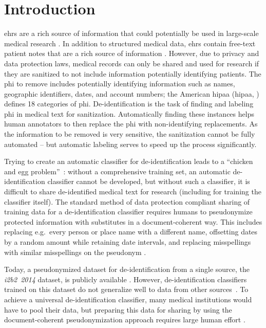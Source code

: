 

\section{Introduction}\label{sec:introduction}
%
\Acp{ehr} are a rich source of information that could potentially be used in large-scale medical research \citep{botsis2010secondary, birkhead2015uses, cowie2017electronic}.
%
In addition to structured medical data, \acp{ehr} contain free-text patient notes that are a rich source of information \citep{jensen2012mining}.
%
However, due to privacy and data protection laws, medical records can only be shared and used for research if they are sanitized to not include information potentially identifying patients.
%
The \ac{phi} to remove includes potentially identifying information such as names, geographic identifiers, dates, and account numbers; the American \acl{hipaa} (\acs{hipaa}, \citeyear{usa1996hipaa}) defines 18 categories of \ac{phi}.
%
De-identification is the task of finding and labeling \ac{phi} in medical text for sanitization.
Automatically finding these instances helps human annotators to then replace the \ac{phi} with
non-identifying replacements.  As the information to be removed is very sensitive, the sanitization
cannot be fully automated -- but automatic labeling serves to speed up the process significantly.

%
Trying to create an automatic classifier for de-identification leads to a ``chicken and egg problem''~\citep{uzuner2007evaluating}: without a comprehensive training set, an automatic de-identification classifier cannot be developed, but without such a classifier, it is difficult to share de-identified medical text for research (including for training the classifier itself).
%
The standard method of data protection compliant sharing of training data for a de-identification classifier requires humans to pseudonymize protected information with substitutes in a document-coherent way.
%
This includes replacing e.g.\ every person or place name with a different name, offsetting dates by a random amount while retaining date intervals, and replacing misspellings with similar misspellings on the pseudonym \cite{uzuner2007evaluating}.

%
Today, a pseudonymized dataset for de-identification from a single source, the \emph{i2b2~2014} dataset, is publicly available \citep{stubbs2015annotating}.
%
However, de-identification classifiers trained on this dataset do not generalize well to data from other sources~\citep{stubbs2017identification}.
%
To achieve a universal de-identification classifier, many medical institutions would have to pool their data, but
%
preparing this data for sharing by using the document-coherent pseudonymization approach requires large human effort \citep{dernoncourt2017identification}.

